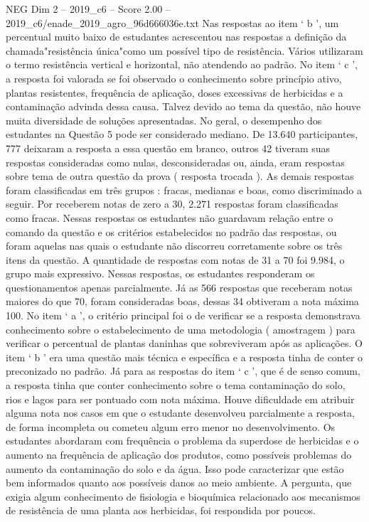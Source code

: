 \begin{textsample}{NEG Dim 2 – 2019\_c6 – Score 2.00 – 2019\_c6/enade\_2019\_agro\_96d666036e.txt}
Nas respostas ao item ‘ b ’, um percentual muito baixo de estudantes acrescentou nas respostas a definição da chamada"resistência única"como um possível tipo de resistência.
Vários utilizaram o termo resistência vertical e horizontal, não atendendo ao padrão.
No item ‘ c ’, a resposta foi valorada se foi observado o conhecimento sobre princípio ativo, plantas resistentes, frequência de aplicação, doses excessivas de herbicidas e a contaminação advinda dessa causa.
Talvez devido ao tema da questão, não houve muita diversidade de soluções apresentadas.
No geral, o desempenho dos estudantes na Questão 5 pode ser considerado mediano.
De 13.640 participantes, 777 deixaram a resposta a essa questão em branco, outros 42 tiveram suas respostas consideradas como nulas, desconsideradas ou, ainda, eram respostas sobre tema de outra questão da prova ( resposta trocada ).
As demais respostas foram classificadas em três grupos : fracas, medianas e boas, como discriminado a seguir.
Por receberem notas de zero a 30, 2.271 respostas foram classificadas como fracas.
Nessas respostas os estudantes não guardavam relação entre o comando da questão e os critérios estabelecidos no padrão das respostas, ou foram aquelas nas quais o estudante não discorreu corretamente sobre os três itens da questão.
A quantidade de respostas com notas de 31 a 70 foi 9.984, o grupo mais expressivo.
Nessas respostas, os estudantes responderam os questionamentos apenas parcialmente.
Já as 566 respostas que receberam notas maiores do que 70, foram consideradas boas, dessas 34 obtiveram a nota máxima 100.
No item ‘ a ’, o critério principal foi o de verificar se a resposta demonstrava conhecimento sobre o estabelecimento de uma metodologia ( amostragem ) para verificar o percentual de plantas daninhas que sobreviveram após as aplicações.
O item ‘ b ’ era uma questão mais técnica e específica e a resposta tinha de conter o preconizado no padrão.
Já para as respostas do item ‘ c ’, que é de senso comum, a resposta tinha que conter conhecimento sobre o tema contaminação do solo, rios e lagos para ser pontuado com nota máxima.
Houve dificuldade em atribuir alguma nota nos casos em que o estudante desenvolveu parcialmente a resposta, de forma incompleta ou cometeu algum erro menor no desenvolvimento.
Os estudantes abordaram com frequência o problema da superdose de herbicidas e o aumento na frequência de aplicação dos produtos, como possíveis problemas do aumento da contaminação do solo e da água.
Isso pode caracterizar que estão bem informados quanto aos possíveis danos ao meio ambiente.
A pergunta, que exigia algum conhecimento de fisiologia e bioquímica relacionado aos mecanismos de resistência de uma planta aos herbicidas, foi respondida por poucos.

\end{textsample}
